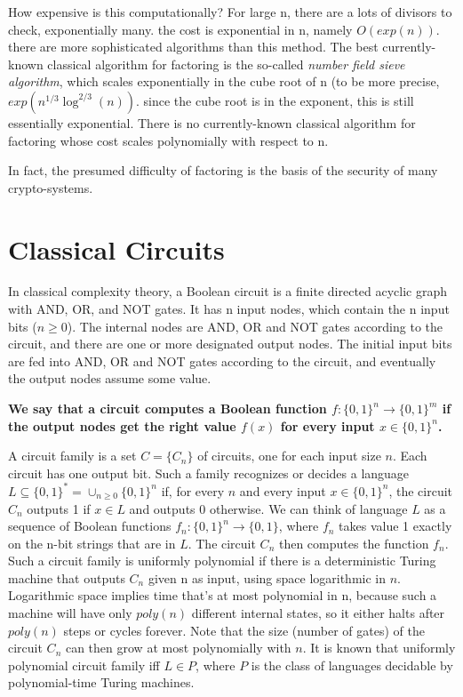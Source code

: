 \documentclass[12pt, oneside]{book}
\theoremstyle{definition}
\theoremstyle{definition}
\theoremstyle{remark}
\begin{document}
How expensive is this computationally? For large n, there are a lots of divisors to check, exponentially many. the cost is exponential in n, namely $O(exp(n))$. there are more sophisticated algorithms than this method. The best currently-known classical algorithm for factoring is the so-called \textit{number field sieve algorithm}, which scales exponentially in the cube root of n (to be more precise, $exp(n^{1/3}\log^{2/3}(n))$. since the cube root is in the exponent, this is still essentially exponential. There is no currently-known classical algorithm for factoring whose cost scales polynomially with respect to n.

In fact, the presumed difficulty of factoring is the basis of the security of many crypto-systems.

\section{Classical Circuits}
In classical complexity theory, a Boolean circuit is a finite directed acyclic graph with AND, OR, and NOT gates. It has n input nodes, which contain the n input bits ($n\geq 0$). The internal nodes are AND, OR and NOT gates according to the circuit, and there are one or more designated output nodes. The initial input bits are fed into AND, OR and NOT gates according to the circuit, and eventually the output nodes assume some value.

\textbf{We say that a circuit computes a Boolean function $f:\{0,1\}^n \rightarrow \{0,1\}^m$ if the output nodes get the right value $f(x)$ for every input $x \in \{0,1\}^n$.}

A circuit family is a set $C=\{C_n\}$ of circuits, one for each input size $n$. Each circuit has one output bit. Such a family recognizes or decides a language $L \subseteq \{0,1\}^*=\cup_{n\geq 0} \{0,1\}^n$ if, for every $n$ and every input $x \in \{0,1\}^n$, the circuit $C_n$ outputs 1 if $x \in L$ and outputs 0 otherwise. We can think of language $L$ as a sequence of Boolean functions $f_n:\{0,1\}^n \rightarrow \{0,1\}$, where $f_n$ takes value 1 exactly on the n-bit strings that are in $L$. The circuit $C_n$ then computes the function $f_n$. Such a circuit family is uniformly polynomial if there is a deterministic Turing machine that outputs $C_n$ given n as input, using space logarithmic in $n$. Logarithmic space implies time that's at most polynomial in n, because such a machine will have only $poly(n)$ different internal states, so it either halts after $poly(n)$ steps or cycles forever. Note that the size (number of gates) of the circuit $C_n$ can then grow at most polynomially with $n$. It is known that uniformly polynomial circuit family iff $L\in P$, where $P$ is the class of languages decidable by polynomial-time Turing machines.
\end{document}
